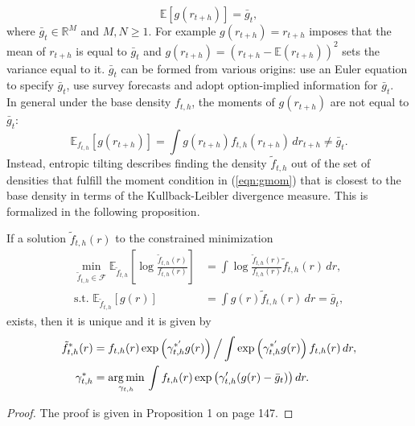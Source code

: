 \begin{equation}\label{eqn:gmom}
	\mathbb{E}\left[g(r_{t+h})\right]=\bar{g}_t,
\end{equation}
where $\bar{g}_t\in \mathbb{R}^M$ and $M,N\geq1$. For example $g(r_{t+h})=r_{t+h}$ imposes that the mean of $r_{t+h}$ is equal to $\bar{g}_t$ and $g(r_{t+h})=\left(r_{t+h}-\mathbb{E}\left(r_{t+h}\right)\right)^2$ sets the variance equal to it. $\bar{g}_t$ can be formed from various origins: \cite{giacomini2014} use an Euler equation to specify $\bar{g}_t$, \cite{altavilla2014,krueger2015} use survey forecasts and \cite{metaxoglou2016} adopt option-implied information for $\bar{g}_t$.\\
%
\indent In general under the base density $f_{t,h}$, the moments of $g(r_{t+h})$ are not equal to $\bar{g}_t$:
\begin{equation}\label{eqn:expf}
	\mathbb{E}_{f_{t,h}}\left[g(r_{t+h})\right]=\int g(r_{t+h})f_{t,h}(r_{t+h})\,dr_{t+h}\neq\bar{g}_t.
\end{equation}
Instead, entropic tilting describes finding the density $\tilde{f}_{t,h}$ out of the set of densities that fulfill the moment condition in (\ref{eqn:gmom}) that is closest to the base density in terms of the Kullback-Leibler divergence measure. This is formalized in the following proposition.
\begin{prop}
	If a solution $\tilde{f}_{t,h}(r)$ to the constrained minimization 
	\begin{align}\label{eqn:klic}
	\min_{\tilde{f}_{t,h}\in\mathcal{F}}\mathbb{E}_{\tilde{f}_{t,h}}\left[\log\frac{\tilde{f}_{t,h}(r)}{f_{t,h}(r)}\right]&=\int \log\frac{\tilde{f}_{t,h}(r)}{f_{t,h}(r)} \tilde{f}_{t,h}(r)\,dr,\\
	\text{s.t. }\mathbb{E}_{\tilde{f}_{t,h}}\left[g(r)\right]&=\int g(r)\tilde{f}_{t,h}(r)\,dr=\bar{g}_t,\label{eqn:klic2}
	\end{align}
	exists, then it is unique and it is given by
	\begin{align}\label{eqn:ftilde}
	\tilde{f}_{t,h}^*(r)&=f_{t,h}(r)\exp\left(\gamma_{t,h}^{*'}g(r)\right)\Big/\int\exp\left(\gamma_{t,h}^{*'}g(r)\right)f_{t,h}(r)\,dr,\\
	\gamma_{t,h}^{*}&=\underset{\gamma_{t,h}}{\rm arg \, min } \,\int f_{t,h}(r)\exp\left(\gamma_{t,h}'(g(r)-\bar{g}_t)\right)dr.\label{eqn:gams}
	\end{align}
\end{prop} 
\begin{proof}
	The proof is given in \cite{giacomini2014} Proposition 1 on page 147.
\end{proof}
